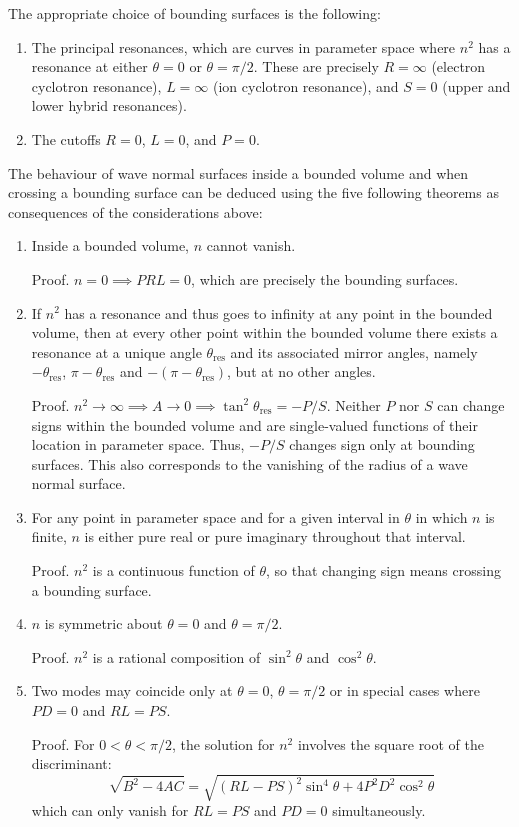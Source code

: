 The appropriate choice of bounding surfaces is the following:

\begin{enumerate}
    \item The principal resonances, which are curves in parameter space where $n^2$ has a resonance at either $\theta=0$ or $\theta=\pi/2$. These are precisely $R=\infty$ (electron cyclotron resonance), $L=\infty$ (ion cyclotron resonance), and $S=0$ (upper and lower hybrid resonances).
    \item The cutoffs $R=0$, $L=0$, and $P=0$.
\end{enumerate}

The behaviour of wave normal surfaces inside a bounded volume and when crossing a bounding surface can be deduced using the five following theorems as consequences of the considerations above:

\begin{enumerate}
    \item Inside a bounded volume, $n$ cannot vanish.
	
    Proof. $n=0\implies PRL=0$, which are precisely the bounding surfaces.
    
    \item If $n^2$ has a resonance and thus goes to infinity at any point in the bounded volume, then at every other point within the bounded volume there exists a resonance at a unique angle $\theta_\text{res}$ and its associated mirror angles, namely $-\theta_\text{res}$, $\pi-\theta_\text{res}$ and $-(\pi-\theta_\text{res})$, but at no other angles.
	
    Proof. $n^2\to\infty\implies A\to0\implies\tan^2{\theta_\text{res}}=-P/S$. Neither $P$ nor $S$ can change signs within the bounded volume and are single-valued functions of their location in parameter space. Thus, $-P/S$ changes sign only at bounding surfaces. This also corresponds to the vanishing of the radius of a wave normal surface.
    
    \item For any point in parameter space and for a given interval in $\theta$ in which $n$ is finite, $n$ is either pure real or pure imaginary throughout that interval.
	
    Proof. $n^2$ is a continuous function of $\theta$, so that changing sign means crossing a bounding surface.

    \item $n$ is symmetric about $\theta=0$ and $\theta=\pi/2$.
	
    Proof. $n^2$ is a rational composition of $\sin^2{\theta}$ and $\cos^2{\theta}$.

    \item Two modes may coincide only at $\theta=0$, $\theta=\pi/2$ or in special cases where $PD=0$ and $RL=PS$.
	
    Proof. For $0<\theta<\pi/2$, the solution for $n^2$ involves the square root of the discriminant:$$\sqrt{B^2-4AC}=\sqrt{(RL-PS)^2\sin^4{\theta}+4P^2D^2\cos^2{\theta}}$$which can only vanish for $RL=PS$ and $PD=0$ simultaneously.
\end{enumerate}

